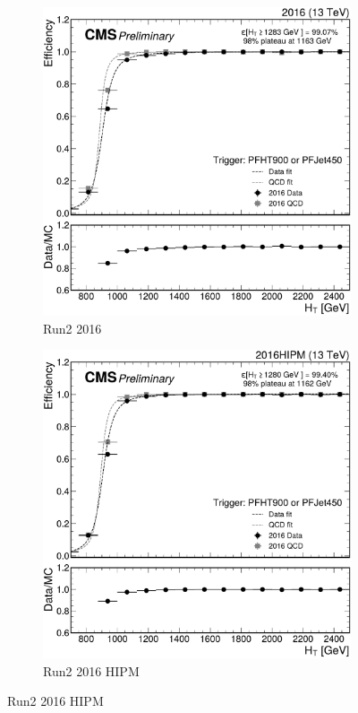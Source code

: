 \begin{figure}[h]
	\centering
	\begin{subfigure}{.45\textwidth}
		\includegraphics[width=\linewidth]{Images/pdfs/16_efficiency_withratio_and_fits.pdf}
		\caption{Run2 2016}
		\label{fig:HT_eff_16}
	\end{subfigure}
	\begin{subfigure}{.45\textwidth}
		\includegraphics[width=\linewidth]{Images/pdfs/16-APV-HIPM_efficiency_withratio_and_fits.pdf}
		\caption{Run2 2016 HIPM}
		\label{fig:HT_eff_16_HIPM}
	\end{subfigure}


\end{figure}
